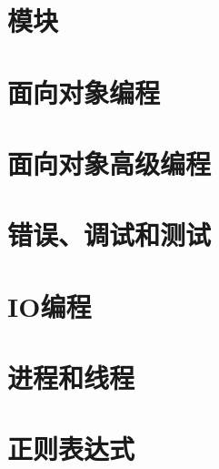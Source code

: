 \newpage
\section{模块}

\newpage

\newpage



\newpage
\section{面向对象编程}

\newpage

\newpage

\newpage

\newpage

\newpage



\newpage
\section{面向对象高级编程}

\newpage

\newpage

\newpage

\newpage

\newpage

\newpage



\newpage
\section{错误、调试和测试}

\newpage

\newpage

\newpage

\newpage



\newpage
\section{IO编程}

\newpage

\newpage

\newpage

\newpage



\newpage
\section{进程和线程}

\newpage

\newpage

\newpage

\newpage

\newpage



\newpage
\section{正则表达式}



